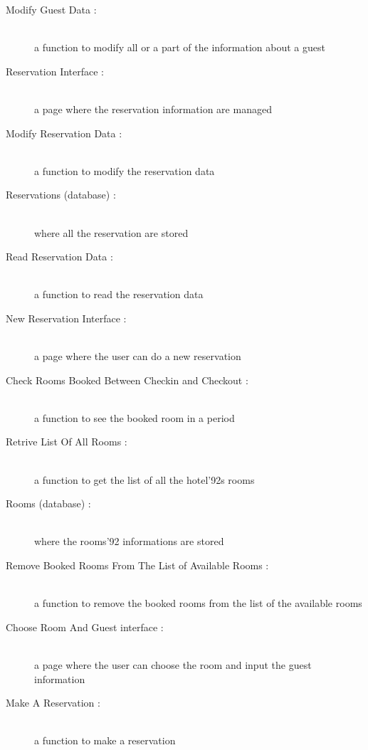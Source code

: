 \begin{description}
  \item[Modify Guest Data :] \hfill \\ a function to modify all or a part of the information about a guest
    
  \item[Reservation Interface :] \hfill \\ a page where the reservation information are managed
    
  \item[Modify Reservation Data :] \hfill \\ a function to modify the reservation data
    
  \item[Reservations (database) :] \hfill \\ where all the reservation are stored
    
  \item[Read Reservation Data :] \hfill \\ a function to read the reservation data
    
  \item[New Reservation Interface :] \hfill \\ a page where the user can do a new reservation

  \item[Check Rooms Booked Between Checkin and Checkout :] \hfill \\ a function to see the booked room in a period
    
  \item[Retrive List Of All Rooms :] \hfill \\ a function to get the list of all the hotel'92s rooms
    
  \item[Rooms (database) :] \hfill \\ where the rooms'92 informations are stored
    
  \item[Remove Booked Rooms From The List of Available Rooms :] \hfill \\ a function to remove the booked rooms from the list of the available rooms

  \item[Choose Room And Guest interface :] \hfill \\ a page where the user can choose the room and input the guest information
    
  \item[Make A Reservation :] \hfill \\ a function to make a reservation


\end{description}
